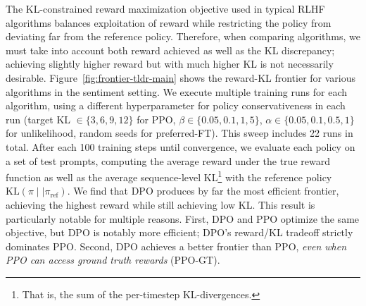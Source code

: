 \documentclass{article}
\newcommand{\piref}{\pi_\text{ref}}
\begin{document}
The KL-constrained reward maximization objective used in typical RLHF algorithms balances exploitation of reward while restricting the policy from deviating far from the reference policy. Therefore, when comparing algorithms, we must take into account both reward achieved as well as the KL discrepancy; achieving slightly higher reward but with much higher KL is not necessarily desirable. Figure~\ref{fig:frontier-tldr-main} shows the reward-KL frontier for various algorithms in the sentiment setting. We execute multiple training runs for each algorithm, using a different hyperparameter for policy conservativeness in each run (target KL $\in\{3,6,9,12\}$ for PPO, $\beta \in \{0.05,0.1,1,5\}$, $\alpha\in\{0.05,0.1,0.5,1\}$ for unlikelihood, random seeds for preferred-FT). This sweep includes 22 runs in total. After each 100 training steps until convergence, we evaluate each policy on a set of test prompts, computing the average reward under the true reward function as well as the average sequence-level KL\footnote{That is, the sum of the per-timestep KL-divergences.} with the reference policy $\text{KL}\left(\pi\mid \mid \piref\right)$. We find that DPO produces by far the most efficient frontier, achieving the highest reward while still achieving low KL. This result is particularly notable for multiple reasons. First, DPO and PPO optimize the same objective, but DPO is notably more efficient; DPO's reward/KL tradeoff strictly dominates PPO. Second, DPO achieves a better frontier than PPO, \emph{even when PPO can access ground truth rewards} (PPO-GT).
\end{document}
